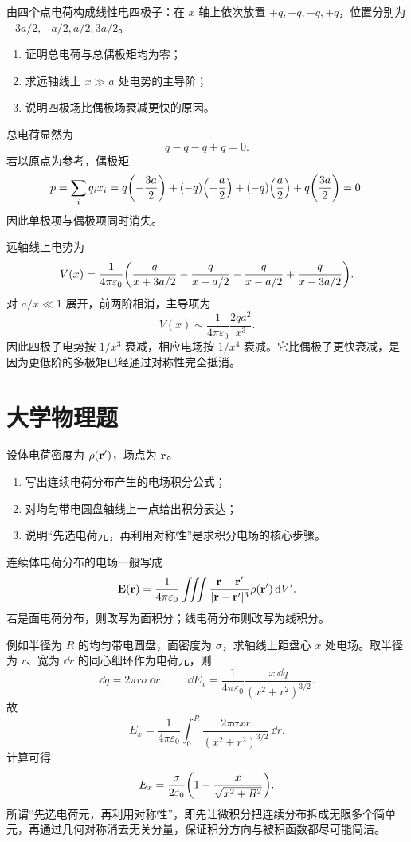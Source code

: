\begin{competition}
由四个点电荷构成线性电四极子：在 $x$ 轴上依次放置 $+q,-q,-q,+q$，位置分别为 $-3a/2,-a/2,a/2,3a/2$。
\begin{enumerate}
  \item 证明总电荷与总偶极矩均为零；
  \item 求远轴线上 $x\gg a$ 处电势的主导阶；
  \item 说明四极场比偶极场衰减更快的原因。
\end{enumerate}
\begin{solution}
总电荷显然为
\[
q-q-q+q=0.
\]
若以原点为参考，偶极矩
\[
p=\sum_i q_i x_i=q\qty(-\frac{3a}{2})+(-q)\qty(-\frac{a}{2})+(-q)\qty(\frac{a}{2})+q\qty(\frac{3a}{2})=0.
\]
因此单极项与偶极项同时消失。

远轴线上电势为
\[
V(x)=\frac{1}{4\pi\varepsilon_0}\qty(\frac{q}{x+3a/2}-\frac{q}{x+a/2}-\frac{q}{x-a/2}+\frac{q}{x-3a/2}).
\]
对 $a/x\ll 1$ 展开，前两阶相消，主导项为
\[
V(x)\sim \frac{1}{4\pi\varepsilon_0}\frac{2qa^2}{x^3}.
\]
因此四极子电势按 $1/x^3$ 衰减，相应电场按 $1/x^4$ 衰减。它比偶极子更快衰减，是因为更低阶的多极矩已经通过对称性完全抵消。
\end{solution}
\end{competition}

\section{大学物理题}

\begin{university}
设体电荷密度为 $\rho(\vb{r}')$，场点为 $\vb{r}$。
\begin{enumerate}
  \item 写出连续电荷分布产生的电场积分公式；
  \item 对均匀带电圆盘轴线上一点给出积分表达；
  \item 说明“先选电荷元，再利用对称性”是求积分电场的核心步骤。
\end{enumerate}
\begin{solution}
连续体电荷分布的电场一般写成
\[
\vb{E}(\vb{r})=\frac{1}{4\pi\varepsilon_0}\iiint \frac{\vb{r}-\vb{r}'}{|\vb{r}-\vb{r}'|^3}\rho(\vb{r}')\,\dd V'.
\]
若是面电荷分布，则改写为面积分；线电荷分布则改写为线积分。

例如半径为 $R$ 的均匀带电圆盘，面密度为 $\sigma$，求轴线上距盘心 $x$ 处电场。取半径为 $r$、宽为 $\dd r$ 的同心细环作为电荷元，则
\[
\dd q=2\pi r\sigma\,\dd r,
\qquad
\dd E_x=\frac{1}{4\pi\varepsilon_0}\frac{x\,\dd q}{(x^2+r^2)^{3/2}}.
\]
故
\[
E_x=\frac{1}{4\pi\varepsilon_0}\int_0^R\frac{2\pi\sigma x r}{(x^2+r^2)^{3/2}}\,\dd r.
\]
计算可得
\[
E_x=\frac{\sigma}{2\varepsilon_0}\qty(1-\frac{x}{\sqrt{x^2+R^2}}).
\]
所谓“先选电荷元，再利用对称性”，即先让微积分把连续分布拆成无限多个简单元，再通过几何对称消去无关分量，保证积分方向与被积函数都尽可能简洁。
\end{solution}
\end{university}

